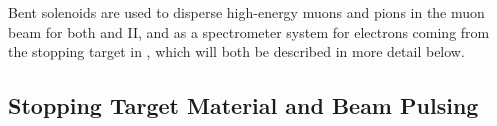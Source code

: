 Bent solenoids are used to disperse high-energy muons and pions in the muon
beam for both \phaseI and II, and as a spectrometer system for electrons coming
from the stopping target in \phaseII, which will both be described in more
detail below.

%
%

\subsection{Stopping Target Material and Beam Pulsing}
\label{sec:stop-tgt}
\FigMuonNuclearParams

